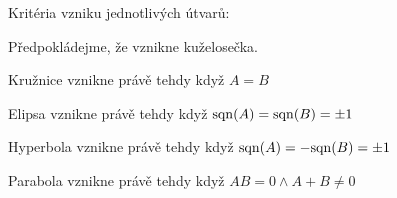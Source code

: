 \Poz
Kritéria vzniku jednotlivých útvarů:

Předpokládejme, že vznikne kuželosečka.

Kružnice vznikne právě tehdy když $A=B$

Elipsa vznikne právě tehdy když ${\rm sqn}(A)={\rm sqn}(B) = \pm 1$

Hyperbola vznikne právě tehdy když ${\rm sqn}(A)=-{\rm sqn}(B) = \pm 1$

Parabola vznikne právě tehdy když $AB = 0 \land A+B \neq 0$



\EndDoc

